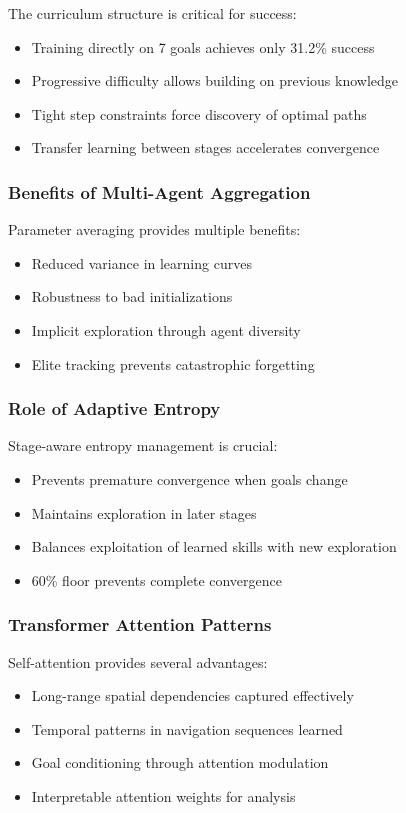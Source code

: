 \documentclass[12pt,a4paper]{article}
\begin{document}
The curriculum structure is critical for success:
\begin{itemize}
    \item Training directly on 7 goals achieves only 31.2\% success
    \item Progressive difficulty allows building on previous knowledge
    \item Tight step constraints force discovery of optimal paths
    \item Transfer learning between stages accelerates convergence
\end{itemize}

\subsubsection{Benefits of Multi-Agent Aggregation}

Parameter averaging provides multiple benefits:
\begin{itemize}
    \item Reduced variance in learning curves
    \item Robustness to bad initializations
    \item Implicit exploration through agent diversity
    \item Elite tracking prevents catastrophic forgetting
\end{itemize}

\subsubsection{Role of Adaptive Entropy}

Stage-aware entropy management is crucial:
\begin{itemize}
    \item Prevents premature convergence when goals change
    \item Maintains exploration in later stages
    \item Balances exploitation of learned skills with new exploration
    \item 60\% floor prevents complete convergence
\end{itemize}

\subsubsection{Transformer Attention Patterns}

Self-attention provides several advantages:
\begin{itemize}
    \item Long-range spatial dependencies captured effectively
    \item Temporal patterns in navigation sequences learned
    \item Goal conditioning through attention modulation
    \item Interpretable attention weights for analysis
\end{itemize}
\end{document}
